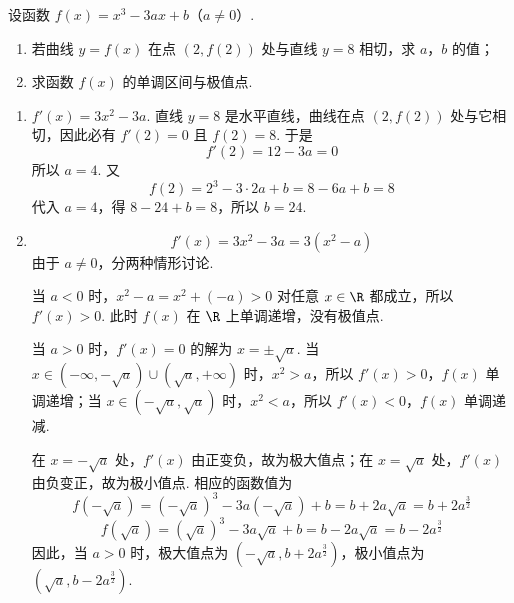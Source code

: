 \begin{problem}
设函数 \( f(x) = x^3 - 3ax + b \)（\(a \neq 0\)）.
\begin{enumerate}
\item 若曲线 \( y = f(x) \) 在点 \((2, f(2))\) 处与直线 \( y = 8 \) 相切，求 \(a\)，\(b\) 的值；
\item 求函数 \( f(x) \) 的单调区间与极值点.
\end{enumerate}

\begin{solution}
\begin{enumerate}
\item \(f'(x)=3x^2-3a\).
直线 \(y=8\) 是水平直线，曲线在点 \((2,f(2))\) 处与它相切，因此必有 \(f'(2)=0\) 且 \(f(2)=8\).
于是
\[
f'(2)=12-3a=0
\]
所以 \(a=4\).
又
\[
f(2)=2^3-3\cdot2a+b=8-6a+b=8
\]
代入 \(a=4\)，得 \(8-24+b=8\)，所以 \(b=24\).

\item
\[
f'(x)=3x^2-3a=3\left(x^2-a\right)
\]
由于 \(a\neq0\)，分两种情形讨论.

当 \(a<0\) 时，\(x^2-a=x^2+(-a)>0\) 对任意 \(x\in\R\) 都成立，所以 \(f'(x)>0\).
此时 \(f(x)\) 在 \(\R\) 上单调递增，没有极值点.

当 \(a>0\) 时，\(f'(x)=0\) 的解为 \(x=\pm\sqrt a\).
当 \(x\in(-\infty,-\sqrt a)\cup(\sqrt a,+\infty)\) 时，\(x^2>a\)，所以 \(f'(x)>0\)，\(f(x)\) 单调递增；当 \(x\in(-\sqrt a,\sqrt a)\) 时，\(x^2<a\)，所以 \(f'(x)<0\)，\(f(x)\) 单调递减.

在 \(x=-\sqrt a\) 处，\(f'(x)\) 由正变负，故为极大值点；在 \(x=\sqrt a\) 处，\(f'(x)\) 由负变正，故为极小值点.
相应的函数值为
\[
f(-\sqrt a)=(-\sqrt a)^3-3a(-\sqrt a)+b=b+2a\sqrt a=b+2a^{\frac{3}{2}}
\]
\[
f(\sqrt a)=(\sqrt a)^3-3a\sqrt a+b=b-2a\sqrt a=b-2a^{\frac{3}{2}}
\]
因此，当 \(a>0\) 时，极大值点为 \(\left(-\sqrt a,b+2a^{\frac{3}{2}}\right)\)，极小值点为 \(\left(\sqrt a,b-2a^{\frac{3}{2}}\right)\).
\end{enumerate}
\end{solution}
\end{problem}

